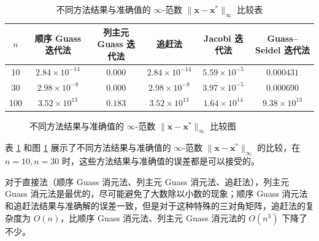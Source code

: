 \documentclass{sjtuarticle}
\begin{document}
\begin{table}[H]
    \centering
    \caption{不同方法结果与准确值的 $\infty$-范数 $\lVert \bm{x}-\bm{x}^* \rVert_\infty$ 比较表}
    \label{tab:res}
    \begin{tabular}{cccccc}
        \toprule
        $n$ & 顺序 Guass 迭代法 & 列主元 Guass 迭代法 & 追赶法 & Jacobi 迭代法 & Guass--Seidel 迭代法 \\
        \midrule
        10  & $2.84\times 10^{-14}$ & $0.000$       & $2.84\times 10^{-14}$ & $5.59\times 10^{-5}$ & $0.000431$           \\
        30  & $2.98\times 10^{-8}$  & $0.000$       & $2.98\times 10^{-8}$  & $3.97\times 10^{-5}$ & $0.000690$           \\
        100 & $3.52\times 10^{13}$  & $0.183$ & $3.52\times 10^{13}$  & $1.64\times 10^{14}$ & $9.38\times 10^{13}$ \\
        \bottomrule
    \end{tabular}
\end{table}

\begin{figure}[h]
\centering
{}
\caption{不同方法结果与准确值的 $\infty$-范数 $\lVert \bm{x}-\bm{x}^* \rVert_\infty$ 比较图}
\label{fig:res}
\end{figure}

表 \ref{tab:res} 和图 \ref{fig:res} 展示了不同方法结果与准确值的 $\infty$-范数 $\lVert \bm{x}-\bm{x}^* \rVert_\infty$ 的比较，在 $n=10,n=30$ 时，这些方法结果与准确值的误差都是可以接受的。

对于直接法（顺序 Guass 消元法、列主元 Guass 消元法、追赶法），列主元 Guass 消元法是最优的，尽可能避免了大数除以小数的现象；顺序 Guass 消元法和追赶法结果与准确解的误差一致，但是对于这种特殊的三对角矩阵，追赶法的复杂度为 $O(n)$，比顺序 Guass 消元法、列主元 Guass 消元法的 $O(n^3)$ 下降了不少。
\end{document}
